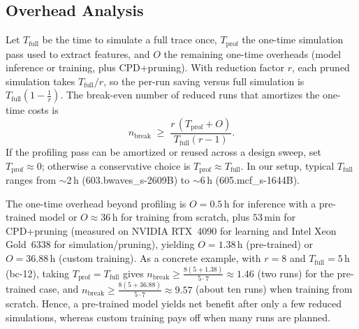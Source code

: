 \subsection{Overhead Analysis}
\label{subsec:overhead}
Let $T_{\text{full}}$ be the time to simulate a full trace once, $T_{\text{prof}}$ the one-time simulation pass used to extract features, and $O$ the remaining one-time overheads (model inference or training, plus CPD+pruning). With reduction factor $r$, each pruned simulation takes $T_{\text{full}}/r$, so the per-run saving versus full simulation is $T_{\text{full}}\!\left(1-\frac{1}{r}\right)$. The break-even number of reduced runs that amortizes the one-time costs is
\begin{equation}
\label{eq:breakeven}
n_{\text{break}} \;\ge\; \frac{r\,(T_{\text{prof}} + O)}{T_{\text{full}}(r-1)}.
\end{equation}
If the profiling pass can be amortized or reused across a design sweep, set $T_{\text{prof}}\!\approx\!0$; otherwise a conservative choice is $T_{\text{prof}}\!\approx\!T_{\text{full}}$. In our setup, typical $T_{\text{full}}$ ranges from $\sim$2\,h (603.bwaves\_s-2609B) to $\sim$6\,h (605.mcf\_s-1644B). 

The one-time overhead beyond profiling is $O{=}0.5$\,h for inference with a pre-trained model or $O{\approx}36$\,h for training from scratch, plus $53$\,min for CPD+pruning (measured on NVIDIA RTX~4090 for learning and Intel Xeon Gold~6338 for simulation/pruning), yielding $O{=}1.38$\,h (pre-trained) or $O{=}36.88$\,h (custom training). As a concrete example, with $r{=}8$ and $T_{\text{full}}{=}5$\,h (bc-12), taking $T_{\text{prof}}{=}T_{\text{full}}$ gives
$n_{\text{break}} \!\ge\! \tfrac{8(5+1.38)}{5\cdot7}\!\approx\!1.46$ (two runs) for the pre-trained case, and
$n_{\text{break}} \!\ge\! \tfrac{8(5+36.88)}{5\cdot7}\!\approx\!9.57$ (about ten runs) when training from scratch. Hence, a pre-trained model yields net benefit after only a few reduced simulations, whereas custom training pays off when many runs are planned.


